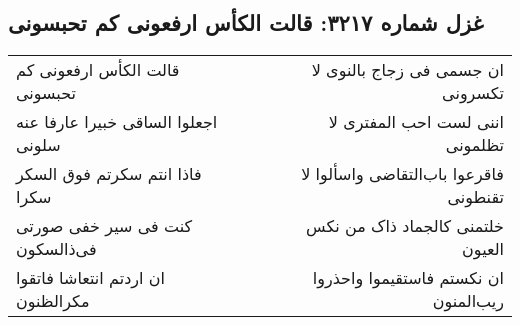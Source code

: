 \begin{center}
\section*{غزل شماره ۳۲۱۷: قالت الکأس ارفعونی کم تحبسونی}
\label{sec:3217}
\begin{longtable}{l p{0.5cm} r}
قالت الکأس ارفعونی کم تحبسونی
&&
ان جسمی فی زجاج بالنوی لا تکسرونی
\\
اجعلوا الساقی خبیرا عارفا عنه سلونی
&&
اننی لست احب المفتری لا تظلمونی
\\
فاذا انتم سکرتم فوق السکر سکرا
&&
فاقرعوا باب‌التقاضی واسألوا لا تقنطونی
\\
کنت فی سیر خفی صورتی فی‌ذالسکون
&&
خلتمنی کالجماد ذاک من نکس العیون
\\
ان اردتم انتعاشا فاتقوا مکرالظنون
&&
ان نکستم فاستقیموا واحذروا ریب‌المنون
\\
\end{longtable}
\end{center}

